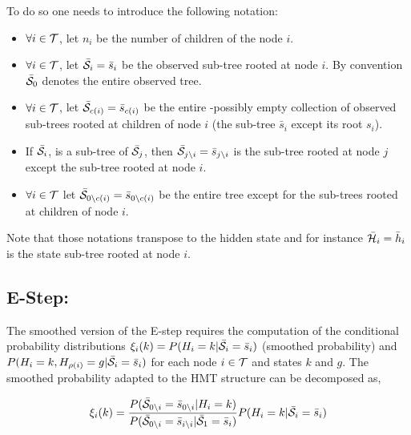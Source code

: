 \documentclass[a4paper,11pt]{report}
\begin{document}
    To do so one needs to introduce the following notation:\\
    \begin{itemize}
			\item $\forall i \in \mathcal{T}$, let $n_{i}$ be the number of children of the node $i$.\\
      \item $\forall i \in \mathcal{T}$, let $\bar{\mathcal{S}}_{i}= \bar{s}_{i}$ be the observed sub-tree rooted at node $i$. By convention $\bar{\mathcal{S}}_{0}$ denotes the entire observed tree.\\
      \item $\forall i \in \mathcal{T}$, let $\bar{\mathcal{S}}_{c(i)}= \bar{s}_{c(i)}$ be the entire -possibly empty collection of observed sub-trees rooted at children of node $i$ (\ie the sub-tree $\bar{s}_{i}$ except its root $s_{i}$).\\
      \item If $\bar{\mathcal{S}}_{i}$, is a sub-tree of $\bar{\mathcal{S}}_{j}$, then $\bar{\mathcal{S}}_{j\backslash i} = \bar{s}_{j\backslash i}$ is the sub-tree rooted at node $j$ except the sub-tree rooted at node $i$.\\
      \item $\forall i \in \mathcal{T}$ let $\bar{\mathcal{S}}_{0\backslash c(i)}= \bar{s}_{0\backslash c(i)}$ be the entire tree except for the sub-trees rooted at children of node $i$.\\
    \end{itemize}
    Note that those notations transpose to the hidden state and for instance $\bar{\mathcal{H}}_{i}= \bar{h}_{i}$ is the state sub-tree rooted at node $i$.\\
    
    \subsection{E-Step:}
			\label{subsec:SCHMT/Learning/E}
			The smoothed version of the E-step requires the computation of the conditional probability distributions $\xi_{i}(k) = P(H_{i}=k | \bar{\mathcal{S}}_{i}= \bar{s}_{i})$ (smoothed probability) and $P(H_{i}=k, H_{\rho(i)}=g | \bar{\mathcal{S}}_{i}= \bar{s}_{i})$ for each node $i \in \mathcal{T}$ and states $k$ and $g$. The smoothed probability adapted to the HMT structure can be decomposed as,
			
			\begin{equation}
			  \xi_{i}(k) = 
					\frac{P(\bar{\mathcal{S}}_{0\backslash i}= \bar{s}_{0\backslash i} | H_{i}=k)}
						{P(\bar{\mathcal{S}}_{0\backslash i}= \bar{s}_{i\backslash i} | \bar{\mathcal{S}}_{1}= \bar{s}_{i})} 
					P(H_{i}= k |\bar{\mathcal{S}}_{i}= \bar{s}_{i})
				\label{eq:Smoothed P decomposition}
			\end{equation}
			
\end{document}
